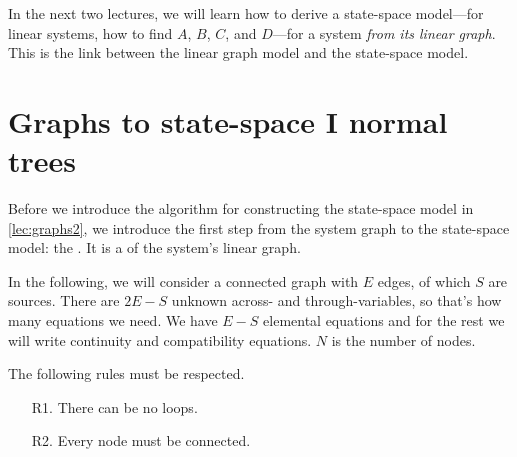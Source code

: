 \documentclass[dynamic_systems.tex]{subfiles}
\begin{document}
In the next two lectures, we will learn how to derive a state-space model---for linear systems, how to find $A$, $B$, $C$, and $D$---for a system \emph{from its linear graph}.
This is the link between the linear graph model and the state-space model.
\tags{}

\section{Graphs to state-space I normal trees}
\tags{}

Before we introduce the algorithm for constructing the state-space model in \autoref{lec:graphs2}, we introduce the first step from the system graph to the state-space model: the .
It is a  of the system's linear graph.
\tags{}

In the following, we will consider a connected graph with $E$ edges, of which $S$ are sources.
There are $2 E - S$ unknown across- and through-variables, so that's how many equations we need.
We have $E-S$ elemental equations and for the rest we will write continuity and compatibility equations.
$N$ is the number of nodes.
\tags{}

The following rules must be respected.
\begin{enumerate}
	\item[R1.] There can be no loops.
	\item[R2.] Every node must be connected.
\end{enumerate}

\newcommand{\blanklineargraphnormal}{%
	\begin{tikzpicture}[]
		\coordinate (g) at (0,0);
		\draw[color=gray!50] (g) pic {groundnode};
		\node[graphnode,color=gray!50] (n2) at (-2,2) {};
		\node[graphnode,color=gray!50] (n3) at (0,2) {};
		\node[graphnode,color=gray!50] (n4) at (2,2) {};
		\draw[sourcebranch,color=gray!50] (n2) to[bend right] node[midway,below=7pt,left=7pt,anchor=north east] {$V_s$} (g);
		\draw[branch,color=gray!50] (n2) to[bend left] node[midway,above] {$R_1$} (n3);
		\draw[branch,color=gray!50] (n3) to[bend left] node[midway,above] {$R_2$} (n4);
		\draw[branch,color=gray!50] (n3) to node[midway,right] {$C$} (g);
		\draw[branch,color=gray!50] (n4) to[bend left] node[midway,right] {$L$} (g);
	\end{tikzpicture}%
}
\end{document}
